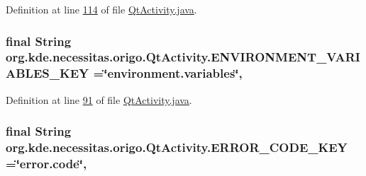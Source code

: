 Definition at line \hyperlink{_qt_activity_8java_source_l00114}{114} of file \hyperlink{_qt_activity_8java_source}{Qt\-Activity.\-java}.

\hypertarget{classorg_1_1kde_1_1necessitas_1_1origo_1_1_qt_activity_aef2f5cd34cd8064e99b9cc5592ad5ee0}{
\subsubsection[{E\-N\-V\-I\-R\-O\-N\-M\-E\-N\-T\-\_\-\-V\-A\-R\-I\-A\-B\-L\-E\-S\-\_\-\-K\-E\-Y}]{\setlength{\rightskip}{0pt plus 5cm}final String org.\-kde.\-necessitas.\-origo.\-Qt\-Activity.\-E\-N\-V\-I\-R\-O\-N\-M\-E\-N\-T\-\_\-\-V\-A\-R\-I\-A\-B\-L\-E\-S\-\_\-\-K\-E\-Y =\char`\"{}environment.\-variables\char`\"{}\hspace{0.3cm}{\ttfamily [static]}, {\ttfamily [private]}}}\label{db/d37/classorg_1_1kde_1_1necessitas_1_1origo_1_1_qt_activity_aef2f5cd34cd8064e99b9cc5592ad5ee0}


Definition at line \hyperlink{_qt_activity_8java_source_l00091}{91} of file \hyperlink{_qt_activity_8java_source}{Qt\-Activity.\-java}.

\hypertarget{classorg_1_1kde_1_1necessitas_1_1origo_1_1_qt_activity_a9bc6099504df7d0b80744ba9c3f7906b}{
\subsubsection[{E\-R\-R\-O\-R\-\_\-\-C\-O\-D\-E\-\_\-\-K\-E\-Y}]{\setlength{\rightskip}{0pt plus 5cm}final String org.\-kde.\-necessitas.\-origo.\-Qt\-Activity.\-E\-R\-R\-O\-R\-\_\-\-C\-O\-D\-E\-\_\-\-K\-E\-Y =\char`\"{}error.\-code\char`\"{}\hspace{0.3cm}{\ttfamily [static]}, {\ttfamily [private]}}}\label{db/d37/classorg_1_1kde_1_1necessitas_1_1origo_1_1_qt_activity_a9bc6099504df7d0b80744ba9c3f7906b}


